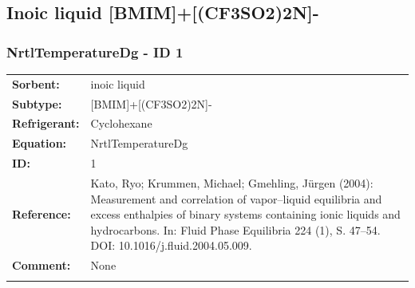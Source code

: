 \subsection{Inoic liquid [BMIM]+[(CF3SO2)2N]-}
%
\subsubsection{NrtlTemperatureDg - ID 1}
%
\begin{tabular}[l]{|lp{11.5cm}|}
\hline
\addlinespace

\textbf{Sorbent:} & inoic liquid \\
\textbf{Subtype:} & [BMIM]+[(CF3SO2)2N]- \\
\textbf{Refrigerant:} & Cyclohexane \\
\textbf{Equation:} & NrtlTemperatureDg \\
\textbf{ID:} & 1 \\
\textbf{Reference:} & Kato, Ryo; Krummen, Michael; Gmehling, Jürgen (2004): Measurement and correlation of vapor–liquid equilibria and excess enthalpies of binary systems containing ionic liquids and hydrocarbons. In: Fluid Phase Equilibria 224 (1), S. 47–54. DOI: 10.1016/j.fluid.2004.05.009. \\
\textbf{Comment:} & None \\

\addlinespace
\hline
\end{tabular}
\newline

